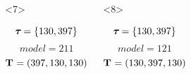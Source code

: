 \begin{frame}[t]
\begin{columns}[c]
\begin{onlyenv}
\begin{minipage}[c][0.5\textheight][c]{\linewidth}
\begin{displaybox}[0.95\linewidth]
\begin{minipage}[c][0.45\textheight][c]{0.95\linewidth}
\[                        \]\vspace{0mm}
                    \end{minipage}
                \end{displaybox}
            \end{minipage}
        \end{onlyenv}
        \begin{onlyenv}<7>
            \begin{minipage}[c][0.5\textheight][c]{\linewidth}
                \begin{displaybox}[0.95\linewidth]
                    \begin{minipage}[c][0.45\textheight][c]{0.95\linewidth}
                        \[
                            \boldsymbol{\tau_{}} = \{130,397\}
                        \]\vspace{0mm}
                        \[
                            model = 211
                        \]\vspace{0mm}
                        \[
                            \mathbf{T_{}} = (397,130,130)
                        \]\vspace{0mm}
                    \end{minipage}
                \end{displaybox}
            \end{minipage}
        \end{onlyenv}
        \begin{onlyenv}<8>
            \begin{minipage}[c][0.5\textheight][c]{\linewidth}
                \begin{displaybox}[0.95\linewidth]
                    \begin{minipage}[c][0.45\textheight][c]{0.95\linewidth}
                        \[
                            \boldsymbol{\tau_{}} = \{130,397\}
                        \]\vspace{0mm}
                        \[
                            model = 121
                        \]\vspace{0mm}
                        \[
                            \mathbf{T_{}} = (130,397,130)
                        \]\vspace{0mm}
                    \end{minipage}
                \end{displaybox}
            \end{minipage}
        \end{onlyenv}

\end{columns}
\end{frame}

